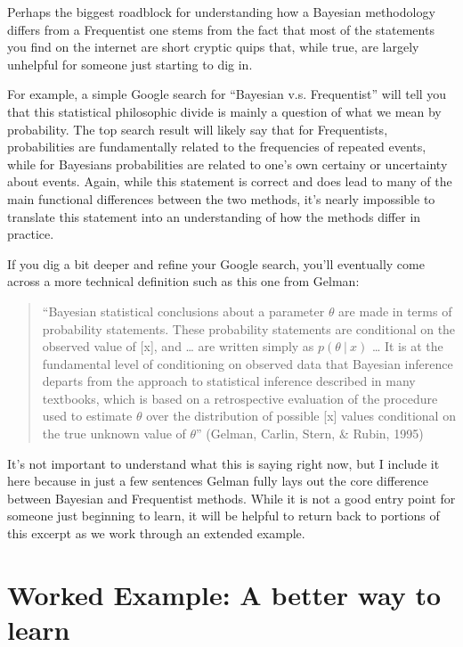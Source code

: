\documentclass[12pt,twoside]{reedthesis}
\begin{document}
Perhaps the biggest roadblock for understanding how a Bayesian methodology differs from a Frequentist one stems from the fact that most of the statements you find on the internet are short cryptic quips that, while true, are largely unhelpful for someone just starting to dig in.

For example, a simple Google search for ``Bayesian v.s. Frequentist'' will tell you that this statistical philosophic divide is mainly a question of what we mean by probability. The top search result will likely say that for Frequentists, probabilities are fundamentally related to the frequencies of repeated events, while for Bayesians probabilities are related to one's own certainy or uncertainty about events. Again, while this statement is correct and does lead to many of the main functional differences between the two methods, it's nearly impossible to translate this statement into an understanding of how the methods differ in practice.

If you dig a bit deeper and refine your Google search, you'll eventually come across a more technical definition such as this one from Gelman:
\begin{quote}
``Bayesian statistical conclusions about a parameter \(\theta\) are made in terms of probability statements. These probability statements are conditional on the observed value of {[}x{]}, and \ldots{} are written simply as \(p(\theta \ | \ x)\) \ldots{} It is at the fundamental level of conditioning on observed data that Bayesian inference departs from the approach to statistical inference described in many textbooks, which is based on a retrospective evaluation of the procedure used to estimate \(\theta\) over the distribution of possible {[}x{]} values conditional on the true unknown value of \(\theta\)'' (Gelman, Carlin, Stern, \& Rubin, 1995)
\end{quote}
It's not important to understand what this is saying right now, but I include it here because in just a few sentences Gelman fully lays out the core difference between Bayesian and Frequentist methods. While it is not a good entry point for someone just beginning to learn, it will be helpful to return back to portions of this excerpt as we work through an extended example.

\hypertarget{worked-example-a-better-way-to-learn}{%
\section{Worked Example: A better way to learn}\label{worked-example-a-better-way-to-learn}}
\end{document}
